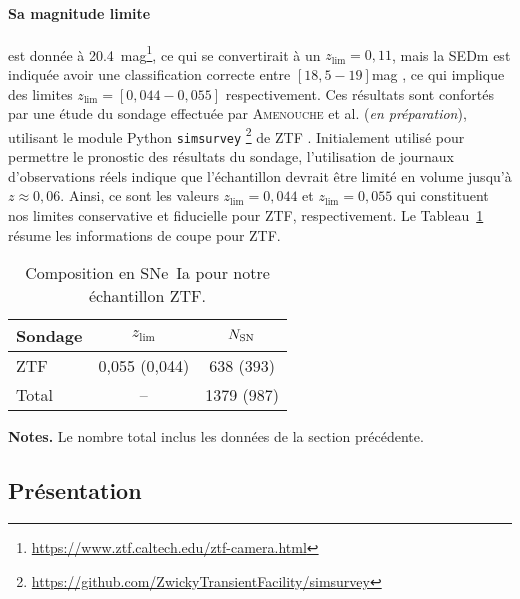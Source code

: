 \documentclass[../main/main.tex]{subfiles}
\begin{document}
\paragraph*{Sa magnitude limite} est donnée à
\SI{20.4}{mag}\footnote{\href{https://www.ztf.caltech.edu/ztf-camera.html}
{https://www.ztf.caltech.edu/ztf-camera.html}}, ce qui se convertirait à un
$z_{\lim} = 0,11$, mais la SEDm est indiquée avoir une classification correcte
entre $[18,5-19]$\si{mag} \citep{fremling2020}, ce qui implique des limites
$z_{\lim} = [0,044-0,055]$ respectivement. Ces résultats sont confortés par une
étude du sondage effectuée par \textsc{Amenouche} et al. (\textit{en
préparation}), utilisant le module Python
\texttt{simsurvey}
\footnote{\href{https://github.com/ZwickyTransientFacility/simsurvey}
{https://github.com/ZwickyTransientFacility/simsurvey}} de ZTF
\citep{feindt2019}. Initialement utilisé pour permettre le pronostic des
résultats du sondage, l'utilisation de journaux d'observations réels indique que
l'échantillon devrait être limité en volume jusqu'à $z \approx 0,06$. Ainsi, ce
sont les valeurs $z_{\lim} = 0,044$ et $z_{\lim} = 0,055$ qui constituent nos
limites conservative et fiducielle pour ZTF, respectivement. Le
Tableau~\ref{tab:zlimztf} résume les informations de coupe pour ZTF.

\begin{table}[ht]
    \centering
    \begin{threeparttable}
        \caption{Composition en SNe~Ia pour notre échantillon ZTF.}
        \label{tab:zlimztf}
        \begin{tabular}{lcc}
            \toprule
            Sondage & $z_{\lim}$ & $N_{\rm SN}$\\
            \midrule
            ZTF & 0,055 (0,044) & 638 (393) \\
            \midrule
            Total & -- & 1379 (987)\\
            \bottomrule
        \end{tabular}
        \begin{tablenotes}[flushleft]
            \item\small \textbf{\hspace{-3,2pt}Notes.} Le nombre total inclus les
                données de la section précédente.
        \end{tablenotes}
    \end{threeparttable}
\end{table}

\subsection{Présentation}\label{ssec:ztfpres}
\end{document}
